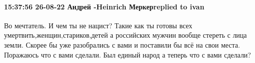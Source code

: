  
 
 
 
 

\paragraph{15:37:56 26-08-22 Андрей -Heinrich Меркерreplied to ivan}

Во мечтатель. И чем ты не нацист? Такие как ты готовы всех
умертвить,женщин,стариков,детей а российских мужчин вообще стереть с лица
земли. Скорее бы уже разобрались с вами и поставили бы всё на свои места.
Поражаюсь что с вами сделали. Был единый народ а теперь что с вами сделали?
